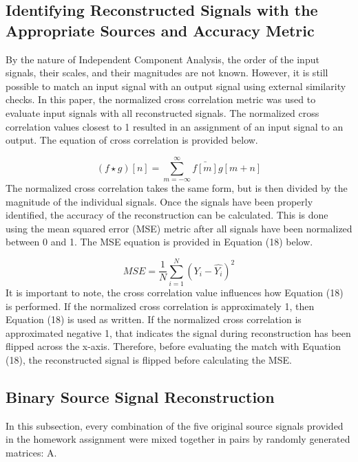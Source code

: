 \documentclass[12pt]{article}
\begin{document}
\subsection{Identifying Reconstructed Signals with the Appropriate Sources and Accuracy Metric}
By the nature of Independent Component Analysis, the order of the input signals, their scales, and their magnitudes are not known. However, it is still possible to match an input signal with an output signal using external similarity checks. In this paper, the normalized cross correlation metric was used to evaluate input signals with all reconstructed signals. The normalized cross correlation values closest to 1 resulted in an assignment of an input signal to an output. The equation of cross correlation is provided below.

\begin{equation}
    (f\star g)[n]=\sum_{m=-\infty}^{\infty} \bar{f[m]}g[m+n]
\end{equation}
\bigbreak
\noindent
The normalized cross correlation takes the same form, but is then divided by the magnitude of the individual signals.
\bigbreak
\noindent
Once the signals have been properly identified, the accuracy of the reconstruction can be calculated. This is done using the mean squared error (MSE) metric after all signals have been normalized between 0 and 1. The MSE equation is provided in Equation (18) below.

\begin{equation}
    MSE=\frac{1}{N}\sum_{i=1}^{N} (Y_{i}-\hat{Y_{i}})^2
\end{equation}
\bigbreak
\noindent
It is important to note, the cross correlation value influences how Equation (18) is performed. If the normalized cross correlation is approximately 1, then Equation (18) is used as written. If the normalized cross correlation is approximated negative 1, that indicates the signal during reconstruction has been flipped across the x-axis. Therefore, before evaluating the match with Equation (18), the reconstructed signal is flipped before calculating the MSE.  

\subsection{Binary Source Signal Reconstruction}

In this subsection, every combination of the five original source signals provided in the homework assignment were mixed together in pairs by randomly generated matrices: A.
\end{document}
